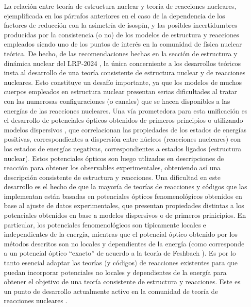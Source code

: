 \documentclass[a4paper,12pt,twoside]{article}
\begin{document}
La relación entre teoría de estructura nuclear y teoría de reacciones nucleares, ejemplificada en los párrafos anteriores en el caso de la dependencia de los factores de reducción con la asimetría de isospín, y las posibles incertidumbres producidas por la consistencia (o no) de los modelos de estructura y reacciones empleados siendo uno de los puntos de interés en la comunidad de física nuclear teórica. De hecho, de las recomendaciones hechas en la sección de estructura y dinámica nuclear del LRP-2024 \cite{nupecc}, la única concerniente a los desarrollos teóricos insta al desarrollo de una teoría consistente de estructura nuclear y de reacciones nucleares. Esto constituye un desafío importante, ya que los modelos de muchos cuerpos empleados en estructura nuclear presentan serias dificultades al tratar con las numerosas configuraciones (o canales) que se hacen disponibles a las energías de las reacciones nucleares. Una vía prometedora para esta unificación es el desarrollo de potenciales ópticos obtenidos de primeros principios \cite{Idi19} o utilizando modelos dispersivos \cite{Cha07}, que correlacionan las propiedades de los estados de energías positivas, correspondientes a dispersión entre núcleos (reacciones nucleares) con los estados de energías negativas, correspondientes a estados ligados (estructura nuclear). Estos potenciales ópticos son luego utlizados en descripciones de reacción para obtener los observables experimentales, obteniendo así una descripción consistente de estructura y reacciones. Una dificultad en este desarrollo es el hecho de que la mayoría de teorías de reacciones y códigos que las implementan están basadas en potenciales ópticos fenomenológicos obtenidos en base al ajuste de datos experimentales, que presentan propiedades distintas a los potenciales obtenidos en base a modelos dispersivos o de primeros prinicipios. En particular, los potenciales fenomenológicos son típicamente locales e independientes de la energía, mientras que el potencial óptico obtenido por los métodos descritos son no locales y dependientes de la energía (como corresponde a un potencial óptico ``exacto'' de acuerdo a la teoría de Feshbach \cite{Fes58}). Es por lo tanto esencial adaptar las teorías (y códigos) de reacciones existentes para que puedan incorporar potenciales no locales y dependientes de la energía para obtener el objetivo de una teoría consistente de estructura y reacciones. Este es un punto de desarrollo actualmente activo en la comunidad de teoría de reacciones nucleares \cite{Tim13,Bai16,Tit16,Lov17,Heb21}.
\end{document}
